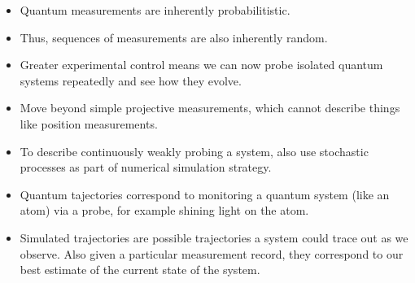 \begin{itemize}
\item Quantum measurements are inherently probabilitistic.  
\item Thus, sequences of measurements are also inherently random.  
\item Greater experimental control means we can now probe isolated quantum systems repeatedly and see how they evolve.  
\item Move beyond simple projective measurements, which cannot describe things like position measurements.
\item To describe continuously weakly probing a system, also use stochastic processes as part of
 numerical simulation strategy.
\item Quantum tajectories correspond to monitoring a quantum system (like an atom) via a probe,
 for example shining light on the atom. \cite{Carmichael1993}
\item Simulated trajectories are possible trajectories a system could trace out as we observe.
  Also given a particular measurement record, they correspond to our best estimate of the current state of the system.  
\end{itemize}



